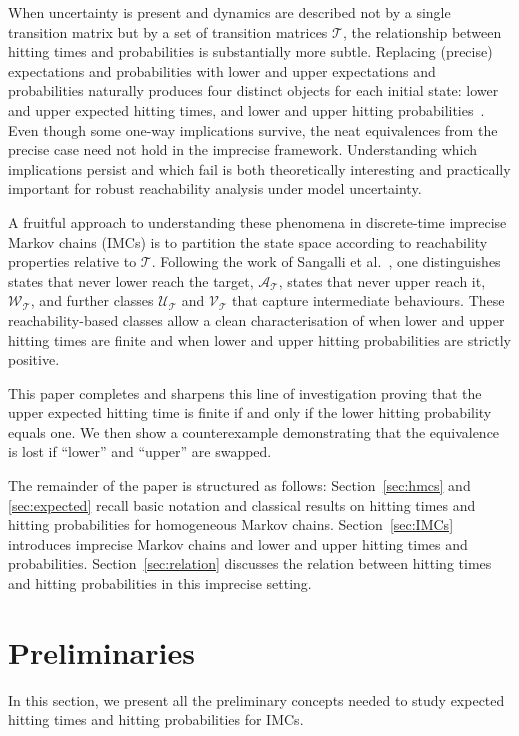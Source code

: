 \documentclass{svproc}
\newcommand{\T}{\mathcal{T}}
\newcommand{\U}{\mathscr{U}}
\newcommand{\V}{\mathscr{V}}
\newcommand{\W}{\mathscr{W}}
\newcommand{\A}{\mathscr{A}}
\begin{document}
    When uncertainty is present and dynamics are described not by a single transition matrix but by a set of transition matrices $\T$, the relationship between hitting times and probabilities is substantially more subtle. Replacing (precise) expectations and probabilities with lower and upper expectations and probabilities naturally produces four distinct objects for each initial state: lower and upper expected hitting times, and lower and upper hitting probabilities~\cite{krak2019hitting, krak2021comphit}. Even though some one-way implications survive, the neat equivalences from the precise case need not hold in the imprecise framework. Understanding which implications persist and which fail is both theoretically interesting and practically important for robust reachability analysis under model uncertainty.

    A fruitful approach to understanding these phenomena in discrete-time imprecise Markov chains (IMCs) is to partition the state space according to reachability properties relative to $\T$. Following the work of Sangalli et al.~\cite{sangalli2025computing, sangalli2025meeting}, one distinguishes states that never lower reach the target, $\A_\T$, states that never upper reach it, $\W_\T$, and further classes $\U_\T$ and $\V_\T$ that capture intermediate behaviours. These reachability-based classes allow a clean characterisation of when lower and upper hitting times are finite and when lower and upper hitting probabilities are strictly positive.

    This paper completes and sharpens this line of investigation proving that the upper expected hitting time is finite if and only if the lower hitting probability equals one. We then show a counterexample demonstrating that the equivalence is lost if “lower” and “upper” are swapped.

    The remainder of the paper is structured as follows: Section~\ref{sec:hmcs} and \ref{sec:expected} recall basic notation and classical results on hitting times and hitting probabilities for homogeneous Markov chains. Section~\ref{sec:IMCs} introduces imprecise Markov chains and lower and upper hitting times and probabilities. 
     Section~\ref{sec:relation} discusses the relation between hitting times and hitting probabilities in this imprecise setting.
    
    \section{Preliminaries}\label{sec:preli}
    In this section, we present all the preliminary concepts needed to study expected hitting times and hitting probabilities for IMCs.
\end{document}

